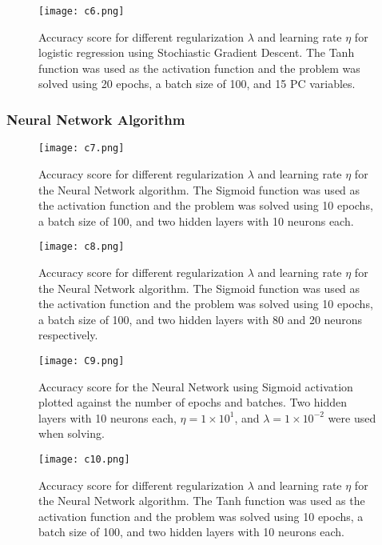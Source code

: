 \documentclass{emulateapj}
\begin{document}
\begin{figure}[H]
    \centering
    \texttt{[image: c6.png]}
    \caption{Accuracy score for different regularization $\lambda$ and learning rate $\eta$ for logistic regression using Stochiastic Gradient Descent. The Tanh function was used as the activation function and the problem was solved using 20 epochs, a batch size of 100, and 15 PC variables.}
    \label{fig9}
\end{figure}
\pagebreak
\subsubsection{Neural Network Algorithm}
\begin{figure}[H]
    \centering
    \texttt{[image: c7.png]}
    \caption{Accuracy score for different regularization $\lambda$ and learning rate $\eta$ for the Neural Network algorithm. The Sigmoid function was used as the activation function and the problem was solved using 10 epochs, a batch size of 100, and two hidden layers with 10 neurons each.}
    \label{fig10}
\end{figure}

\begin{figure}[H]
    \centering
    \texttt{[image: c8.png]}
    \caption{Accuracy score for different regularization $\lambda$ and learning rate $\eta$ for the Neural Network algorithm. The Sigmoid function was used as the activation function and the problem was solved using 10 epochs, a batch size of 100, and two hidden layers with 80 and 20 neurons respectively.}
    \label{fig11}
\end{figure}

\begin{figure}[H]
    \centering
    \texttt{[image: C9.png]}
    \caption{Accuracy score for the Neural Network using Sigmoid activation plotted against the number of epochs and batches. Two hidden layers with 10 neurons each, $\eta = 1\times 10^1$, and $\lambda = 1\times 10^{-2}$ were used when solving.}
    \label{fig12}
\end{figure}

\begin{figure}[H]
    \centering
    \texttt{[image: c10.png]}
    \caption{Accuracy score for different regularization $\lambda$ and learning rate $\eta$ for the Neural Network algorithm. The Tanh function was used as the activation function and the problem was solved using 10 epochs, a batch size of 100, and two hidden layers with 10 neurons each.}
    \label{fig13}
\end{figure}
\end{document}
